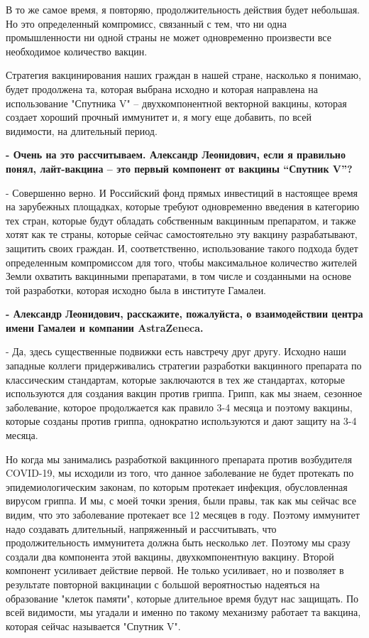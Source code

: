 В то же самое время, я повторяю, продолжительность действия будет небольшая. Но
это определенный компромисс, связанный с тем, что ни одна промышленности ни
одной страны не может одновременно произвести все необходимое количество
вакцин.

Стратегия вакцинирования наших граждан в нашей стране, насколько я понимаю,
будет продолжена та, которая выбрана исходно и которая направлена на
использование "Спутника V" – двухкомпонентной векторной вакцины, которая
создает хороший прочный иммунитет и, я могу еще добавить, по всей видимости, на
длительный период.

\textbf{- Очень на это рассчитываем. Александр Леонидович, если я правильно понял,
лайт-вакцина – это первый компонент от вакцины \enquote{Спутник V}?}

- Совершенно верно. И Российский фонд прямых инвестиций в настоящее время на
зарубежных площадках, которые требуют одновременно введения в категорию тех
стран, которые будут обладать собственным вакцинным препаратом, и также хотят
как те страны, которые сейчас самостоятельно эту вакцину разрабатывают,
защитить своих граждан. И, соответственно, использование такого подхода будет
определенным компромиссом для того, чтобы максимальное количество жителей Земли
охватить вакцинными препаратами, в том числе и созданными на основе той
разработки, которая исходно была в институте Гамалеи.

\textbf{- Александр Леонидович, расскажите, пожалуйста, о взаимодействии центра имени
Гамалеи и компании AstraZeneca.}

- Да, здесь существенные подвижки есть навстречу друг другу. Исходно наши
западные коллеги придерживались стратегии разработки вакцинного препарата по
классическим стандартам, которые заключаются в тех же стандартах, которые
используются для создания вакцин против гриппа. Грипп, как мы знаем, сезонное
заболевание, которое продолжается как правило 3-4 месяца и поэтому вакцины,
которые созданы против гриппа, однократно используются и дают защиту на 3-4
месяца.

Но когда мы занимались разработкой вакцинного препарата против возбудителя
COVID-19, мы исходили из того, что данное заболевание не будет протекать по
эпидемиологическим законам, по которым протекает инфекция, обусловленная
вирусом гриппа. И мы, с моей точки зрения, были правы, так как мы сейчас все
видим, что это заболевание протекает все 12 месяцев в году. Поэтому иммунитет
надо создавать длительный, напряженный и рассчитывать, что продолжительность
иммунитета должна быть несколько лет. Поэтому мы сразу создали два компонента
этой вакцины, двухкомпонентную вакцину. Второй компонент усиливает действие
первой. Не только усиливает, но и позволяет в результате повторной вакцинации с
большой вероятностью надеяться на образование "клеток памяти", которые
длительное время будут нас защищать. По всей видимости, мы угадали и именно по
такому механизму работает та вакцина, которая сейчас называется "Спутник V".

